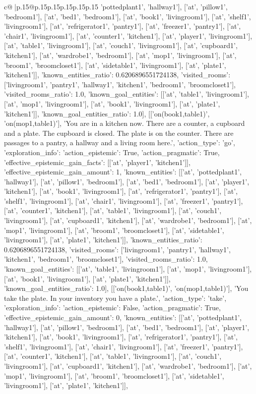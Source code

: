 \documentclass{article}
\begin{document}
{\begin{supertabular}{c@{$\;$}|p{.15\linewidth}@{}p{.15\linewidth}p{.15\linewidth}p{.15\linewidth}p{.15\linewidth}p{.15\linewidth}}
{{{'pottedplant1', 'hallway1'], ['at', 'pillow1', 'bedroom1'], ['at', 'bed1', 'bedroom1'], ['at', 'book1', 'livingroom1'], ['at', 'shelf1', 'livingroom1'], ['at', 'refrigerator1', 'pantry1'], ['at', 'freezer1', 'pantry1'], ['at', 'chair1', 'livingroom1'], ['at', 'counter1', 'kitchen1'], ['at', 'player1', 'livingroom1'], ['at', 'table1', 'livingroom1'], ['at', 'couch1', 'livingroom1'], ['at', 'cupboard1', 'kitchen1'], ['at', 'wardrobe1', 'bedroom1'], ['at', 'mop1', 'livingroom1'], ['at', 'broom1', 'broomcloset1'], ['at', 'sidetable1', 'livingroom1'], ['at', 'plate1', 'kitchen1']], 'known_entities_ratio': 0.6206896551724138, 'visited_rooms': ['livingroom1', 'pantry1', 'hallway1', 'kitchen1', 'bedroom1', 'broomcloset1'], 'visited_rooms_ratio': 1.0, 'known_goal_entities': [['at', 'table1', 'livingroom1'], ['at', 'mop1', 'livingroom1'], ['at', 'book1', 'livingroom1'], ['at', 'plate1', 'kitchen1']], 'known_goal_entities_ratio': 1.0}}], [['on(book1,table1)', 'on(mop1,table1)'], 'You are in a kitchen now. There are a counter, a cupboard and a plate. The cupboard is closed. The plate is on the counter. There are passages to a pantry, a hallway and a living room here.', {'action_type': 'go', 'exploration_info': {'action_epistemic': True, 'action_pragmatic': True, 'effective_epistemic_gain_facts': [['at', 'player1', 'kitchen1']], 'effective_epistemic_gain_amount': 1, 'known_entities': [['at', 'pottedplant1', 'hallway1'], ['at', 'pillow1', 'bedroom1'], ['at', 'bed1', 'bedroom1'], ['at', 'player1', 'kitchen1'], ['at', 'book1', 'livingroom1'], ['at', 'refrigerator1', 'pantry1'], ['at', 'shelf1', 'livingroom1'], ['at', 'chair1', 'livingroom1'], ['at', 'freezer1', 'pantry1'], ['at', 'counter1', 'kitchen1'], ['at', 'table1', 'livingroom1'], ['at', 'couch1', 'livingroom1'], ['at', 'cupboard1', 'kitchen1'], ['at', 'wardrobe1', 'bedroom1'], ['at', 'mop1', 'livingroom1'], ['at', 'broom1', 'broomcloset1'], ['at', 'sidetable1', 'livingroom1'], ['at', 'plate1', 'kitchen1']], 'known_entities_ratio': 0.6206896551724138, 'visited_rooms': ['livingroom1', 'pantry1', 'hallway1', 'kitchen1', 'bedroom1', 'broomcloset1'], 'visited_rooms_ratio': 1.0, 'known_goal_entities': [['at', 'table1', 'livingroom1'], ['at', 'mop1', 'livingroom1'], ['at', 'book1', 'livingroom1'], ['at', 'plate1', 'kitchen1']], 'known_goal_entities_ratio': 1.0}}], [['on(book1,table1)', 'on(mop1,table1)'], 'You take the plate. In your inventory you have a plate.', {'action_type': 'take', 'exploration_info': {'action_epistemic': False, 'action_pragmatic': True, 'effective_epistemic_gain_amount': 0, 'known_entities': [['at', 'pottedplant1', 'hallway1'], ['at', 'pillow1', 'bedroom1'], ['at', 'bed1', 'bedroom1'], ['at', 'player1', 'kitchen1'], ['at', 'book1', 'livingroom1'], ['at', 'refrigerator1', 'pantry1'], ['at', 'shelf1', 'livingroom1'], ['at', 'chair1', 'livingroom1'], ['at', 'freezer1', 'pantry1'], ['at', 'counter1', 'kitchen1'], ['at', 'table1', 'livingroom1'], ['at', 'couch1', 'livingroom1'], ['at', 'cupboard1', 'kitchen1'], ['at', 'wardrobe1', 'bedroom1'], ['at', 'mop1', 'livingroom1'], ['at', 'broom1', 'broomcloset1'], ['at', 'sidetable1', 'livingroom1'], ['at', 'plate1', 'kitchen1']], }}}
\end{supertabular}}
\end{document}
